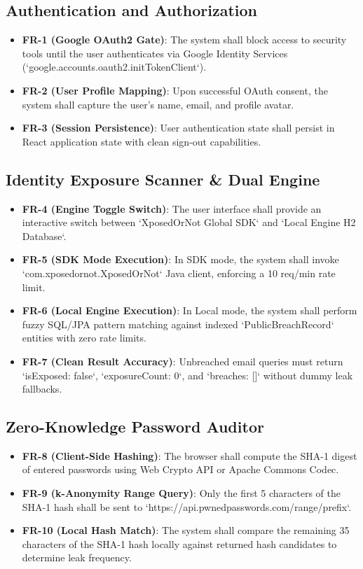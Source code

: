 \documentclass[12pt,a4paper,oneside]{report}
\begin{document}
\subsection{Authentication and Authorization}
\begin{itemize}
    \item \textbf{FR-1 (Google OAuth2 Gate)}: The system shall block access to security tools until the user authenticates via Google Identity Services (`google.accounts.oauth2.initTokenClient`).
    \item \textbf{FR-2 (User Profile Mapping)}: Upon successful OAuth consent, the system shall capture the user's name, email, and profile avatar.
    \item \textbf{FR-3 (Session Persistence)}: User authentication state shall persist in React application state with clean sign-out capabilities.
\end{itemize}

\subsection{Identity Exposure Scanner & Dual Engine}
\begin{itemize}
    \item \textbf{FR-4 (Engine Toggle Switch)}: The user interface shall provide an interactive switch between `XposedOrNot Global SDK` and `Local Engine H2 Database`.
    \item \textbf{FR-5 (SDK Mode Execution)}: In SDK mode, the system shall invoke `com.xposedornot.XposedOrNot` Java client, enforcing a 10 req/min rate limit.
    \item \textbf{FR-6 (Local Engine Execution)}: In Local mode, the system shall perform fuzzy SQL/JPA pattern matching against indexed `PublicBreachRecord` entities with zero rate limits.
    \item \textbf{FR-7 (Clean Result Accuracy)}: Unbreached email queries must return `isExposed: false`, `exposureCount: 0`, and `breaches: []` without dummy leak fallbacks.
\end{itemize}

\subsection{Zero-Knowledge Password Auditor}
\begin{itemize}
    \item \textbf{FR-8 (Client-Side Hashing)}: The browser shall compute the SHA-1 digest of entered passwords using Web Crypto API or Apache Commons Codec.
    \item \textbf{FR-9 (k-Anonymity Range Query)}: Only the first 5 characters of the SHA-1 hash shall be sent to `https://api.pwnedpasswords.com/range/{prefix}`.
    \item \textbf{FR-10 (Local Hash Match)}: The system shall compare the remaining 35 characters of the SHA-1 hash locally against returned hash candidates to determine leak frequency.
\end{itemize}
\end{document}

